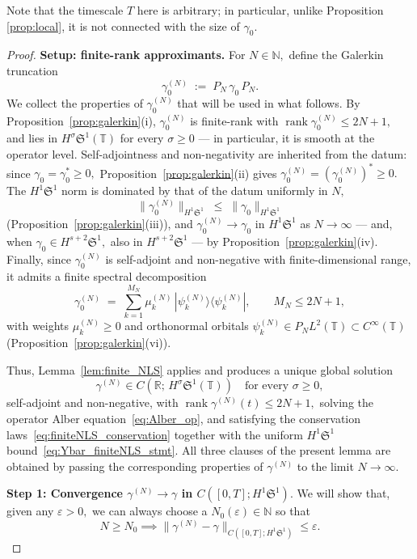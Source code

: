 \documentclass[11pt]{amsart}
\theoremstyle{definition}
\newcommand{\R}{\mathbb{R}}
\newcommand{\T}{\mathbb{T}}
\newcommand{\Sp}{\mathfrak{S}}
\begin{document}
\noindent Note that the timescale $T$ here is arbitrary; in particular, unlike Proposition \ref{prop:local}, it is not connected with the size of $\gamma_0.$

\begin{proof}
\noindent\textbf{Setup: finite-rank approximants.} For $N\in\mathbb{N},$ define the Galerkin truncation
\[
  \gamma_0^{(N)} \;:=\; P_N\,\gamma_0\,P_N.
\]
We collect the properties of $\gamma_0^{(N)}$ that will be used in what follows. By Proposition~\ref{prop:galerkin}(i), $\gamma_0^{(N)}$ is finite-rank with $\operatorname{rank}\gamma_0^{(N)}\le 2N+1,$ and lies in $H^\sigma\Sp^1(\T)$ for every $\sigma\ge 0$ --- in particular, it is smooth at the operator level. Self-adjointness and non-negativity are inherited from the datum: since $\gamma_0=\gamma_0^*\ge 0,$ Proposition~\ref{prop:galerkin}(ii) gives $\gamma_0^{(N)}=(\gamma_0^{(N)})^*\ge 0.$ The $H^1\Sp^1$ norm is dominated by that of the datum uniformly in $N,$
\[
  \|\gamma_0^{(N)}\|_{H^1\Sp^1}\;\le\;\|\gamma_0\|_{H^1\Sp^1}
\]
(Proposition~\ref{prop:galerkin}(iii)), and $\gamma_0^{(N)}\to\gamma_0$ in $H^1\Sp^1$ as $N\to\infty$ --- and, when $\gamma_0\in H^{s+2}\Sp^1,$ also in $H^{s+2}\Sp^1$ --- by Proposition~\ref{prop:galerkin}(iv). Finally, since $\gamma_0^{(N)}$ is self-adjoint and non-negative with finite-dimensional range, it admits a finite spectral decomposition
\[
  \gamma_0^{(N)} \;=\; \sum_{k=1}^{M_N}\mu_k^{(N)}\,|\psi_k^{(N)}\rangle\langle\psi_k^{(N)}|,
  \qquad M_N\le 2N+1,
\]
with weights $\mu_k^{(N)}\ge 0$ and orthonormal orbitals $\psi_k^{(N)}\in P_N L^2(\T)\subset C^\infty(\T)$ (Proposition~\ref{prop:galerkin}(vi)).

Thus, Lemma~\ref{lem:finite_NLS} applies and produces a unique global solution
\[
  \gamma^{(N)}\in C(\R;\,H^\sigma\Sp^1(\T)) \quad \text{for every } \sigma\ge 0,
\]
self-adjoint and non-negative, with $\operatorname{rank}\gamma^{(N)}(t)\le 2N+1,$ solving the operator Alber equation~\eqref{eq:Alber_op}, and satisfying the conservation laws~\eqref{eq:finiteNLS_conservation} together with the uniform $H^1\Sp^1$ bound~\eqref{eq:Ybar_finiteNLS_stmt}. All three clauses of the present lemma are obtained by passing the corresponding properties of $\gamma^{(N)}$ to the limit $N\to\infty.$

\smallskip
\noindent\textbf{Step 1: Convergence $\gamma^{(N)}\to\gamma$ in $C([0,T];H^1\Sp^1).$} We will show that, given any $\varepsilon>0,$ we can always choose a $N_0(\varepsilon)\in\mathbb{N}$ so that
\begin{equation}\label{eq:imdef3}
N\ge N_0 \implies \|\gamma^{(N)}-\gamma\|_{C([0,T];H^1\Sp^1)}\le \varepsilon.
\end{equation}


\end{proof}
\end{document}
